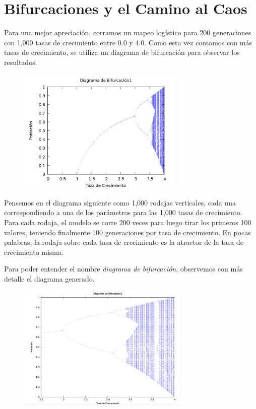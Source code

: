 \documentclass{article}
\begin{document}
\section{Bifurcaciones y el Camino al Caos}
Para una mejor apreciación, corramos un mapeo logístico para 200 generaciones con 1,000 tasas de crecimiento entre 0.0 y 4.0. Como esta vez contamos con más tasas de crecimiento, se utiliza un diagrama de bifurcación para observar los resultados.


	\begin{figure}[h!]
    \includegraphics[height=6cm]{graf2.png}
    \centering
    \end{figure}

Pensemos en el diagrama siguiente como 1,000 rodajas verticales, cada una correspondiendo a una de los parámetros para las 1,000 tasas de crecimiento. Para cada rodaja, el modelo se corre 200 veces para luego tirar los primeros 100 valores, teniendo finalmente 100 generaciones por tasa de crecimiento. En pocas palabras, la rodaja sobre cada tasa de crecimiento es la atractor de la tasa de crecimiento misma. 

Para poder entender el nombre \textit{diagrama de bifurcación}, observemos con más detalle el diagrama generado.


	\begin{figure}[h!]
    \includegraphics[height=6cm]{graf3.png}
    \centering
    \end{figure}
\end{document}
